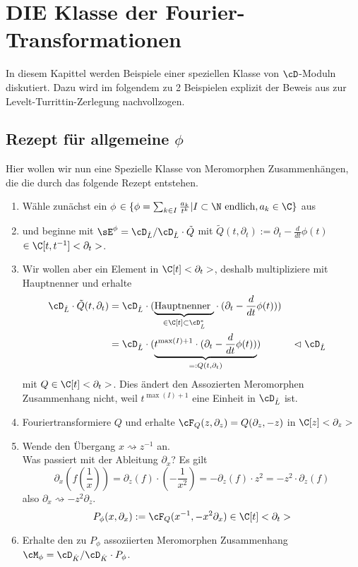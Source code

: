 \chapter{DIE Klasse der Fourier-Transformationen}
In diesem Kapittel werden Beispiele einer speziellen Klasse von $\cD$-Moduln
diskutiert. Dazu wird im folgendem zu 2 Beispielen explizit der Beweis aus
\cite{sabbah_cimpa90} zur Levelt-Turrittin-Zerlegung nachvollzogen.

\section{Rezept für allgemeine $\phi$} \label{sec:allgemeinProblem}
Hier wollen wir nun eine Spezielle Klasse von Meromorphen Zusammenhängen, die
die durch das folgende Rezept entstehen.
\begin{enumerate}
\item Wähle zunächst ein $\phi$
$\in\{\phi=\sum_{k\in I}\frac{a_k}{t^{k}}|I\subset\N\mbox{ endlich}
,a_k\in \C\}$
aus
\item und beginne mit $\sE^{\phi}=\cD_{\hat L}/\cD_{\hat L}\cdot \tilde Q$
mit
$ \tilde Q(t,\partial_t):=\partial_t-\frac{d}{dt}\phi(t)$
$\in\C[t,t^{-1}]<\partial_t>$.
\item Wir wollen aber ein Element in $\C[t]<\partial_t>$,
deshalb multipliziere mit Hauptnenner und erhalte
\begin{align*}
\cD_{\hat L}\cdot \tilde Q(t,\partial_t)
  &=\cD_{\hat L}\cdot (\underset{\in\C[t]\subset\cD_{\hat L}^*}
    {\underbrace{\mbox{Hauptnenner }}}
  \cdot (\partial_t-\frac{d}{dt}\phi(t))) \\
&=\cD_{\hat L}\cdot ( \underset{=:Q(t,\partial_t)}{\underbrace{
  t^{\max(I)+1} \cdot (\partial_t-\frac{d}{dt}\phi(t))}})
  & & \vartriangleleft\cD_{\hat L}
\end{align*}
mit $Q\in\C[t]<\partial_t>$.
Dies ändert den Assozierten Meromorphen Zusammenhang nicht, weil
$t^{\max(I)+1}$ eine Einheit in $\cD_{\hat L}$ ist.
\item Fouriertransformiere $Q$ und erhalte
$\cF_Q(z,\partial_z)=Q(\partial_z,-z)$ in $\C[z]<\partial_z>$
\item Wende den Übergang $x\rightsquigarrow z^{-1}$ an.\\
Was passiert mit der Ableitung $\partial_x$? Es gilt
\[
\partial_x (f(\frac{1}{x}))=
\partial_z(f)\cdot (-\frac{1}{x^2})=
-\partial_z(f)\cdot z^2= %
- z^2 \cdot \partial_z(f)
\]
also $ \partial_x\rightsquigarrow-z^2\partial_z $.
\[
P_\phi(x,\partial_x):=\cF_Q(x^{-1},-x^2\partial_x) \in \C[t]<\partial_t>
\]
\item Erhalte den zu $P_\phi$ assoziierten Meromorphen Zusammenhang
$\cM_\phi=\cD_{\hat K}/\cD_{\hat K}\cdot P_{\phi}$.
\end{enumerate}

